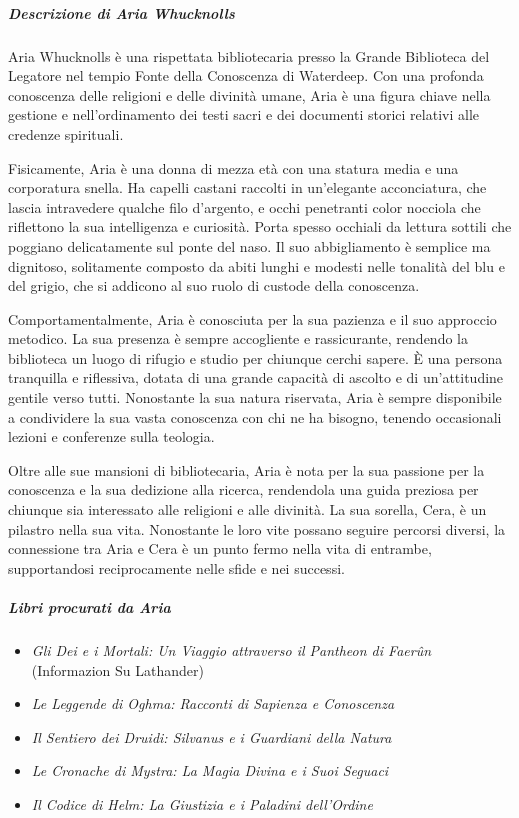 \documentclass{article}
\begin{document}
        \subparagraph{Descrizione di Aria Whucknolls}
        Aria Whucknolls è una rispettata bibliotecaria presso la Grande Biblioteca del Legatore nel tempio Fonte della Conoscenza di Waterdeep. Con una profonda conoscenza delle religioni e delle divinità umane, Aria è una figura chiave nella gestione e nell'ordinamento dei testi sacri e dei documenti storici relativi alle credenze spirituali.
        
        Fisicamente, Aria è una donna di mezza età con una statura media e una corporatura snella. Ha capelli castani raccolti in un'elegante acconciatura, che lascia intravedere qualche filo d'argento, e occhi penetranti color nocciola che riflettono la sua intelligenza e curiosità. Porta spesso occhiali da lettura sottili che poggiano delicatamente sul ponte del naso. Il suo abbigliamento è semplice ma dignitoso, solitamente composto da abiti lunghi e modesti nelle tonalità del blu e del grigio, che si addicono al suo ruolo di custode della conoscenza.
        
        Comportamentalmente, Aria è conosciuta per la sua pazienza e il suo approccio metodico. La sua presenza è sempre accogliente e rassicurante, rendendo la biblioteca un luogo di rifugio e studio per chiunque cerchi sapere. È una persona tranquilla e riflessiva, dotata di una grande capacità di ascolto e di un'attitudine gentile verso tutti. Nonostante la sua natura riservata, Aria è sempre disponibile a condividere la sua vasta conoscenza con chi ne ha bisogno, tenendo occasionali lezioni e conferenze sulla teologia.
        
        Oltre alle sue mansioni di bibliotecaria, Aria è nota per la sua passione per la conoscenza e la sua dedizione alla ricerca, rendendola una guida preziosa per chiunque sia interessato alle religioni e alle divinità. La sua sorella, Cera, è un pilastro nella sua vita. Nonostante le loro vite possano seguire percorsi diversi, la connessione tra Aria e Cera è un punto fermo nella vita di entrambe, supportandosi reciprocamente nelle sfide e nei successi.
    
    \subparagraph{Libri procurati da Aria} \begin{itemize}
        \item \textit{Gli Dei e i Mortali: Un Viaggio attraverso il Pantheon di Faerûn} (Informazion Su Lathander)
        \item \textit{Le Leggende di Oghma: Racconti di Sapienza e Conoscenza}
        \item \textit{Il Sentiero dei Druidi: Silvanus e i Guardiani della Natura}
        \item \textit{Le Cronache di Mystra: La Magia Divina e i Suoi Seguaci}
        \item \textit{Il Codice di Helm: La Giustizia e i Paladini dell'Ordine}
    \end{itemize}
\end{document}
